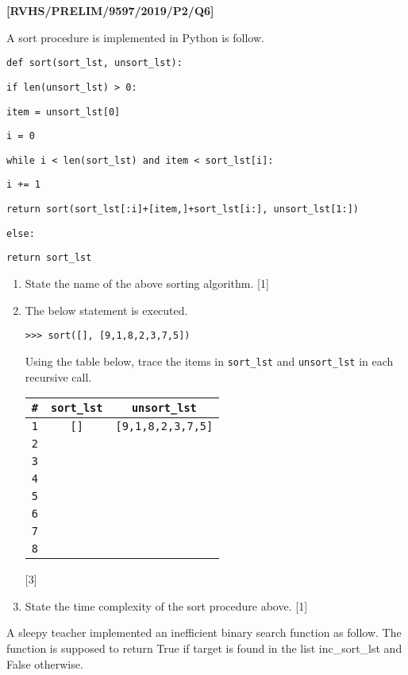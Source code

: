 \item \textbf{{[}RVHS/PRELIM/9597/2019/P2/Q6{]} }

A sort procedure is implemented in Python is follow.

\noindent %
\noindent\begin{minipage}[t]{1\columnwidth}%
\texttt{def sort(sort\_lst, unsort\_lst):}

\texttt{\qquad{}if len(unsort\_lst) > 0: }

\texttt{\qquad{}\qquad{}item = unsort\_lst{[}0{]} }

\texttt{\qquad{}\qquad{}i = 0 }

\texttt{\qquad{}\qquad{}while i < len(sort\_lst) and item < sort\_lst{[}i{]}: }

\texttt{\qquad{}\qquad{}\qquad{}i += 1 }

\texttt{\qquad{}\qquad{}return sort(sort\_lst{[}:i{]}+{[}item,{]}+sort\_lst{[}i:{]},
unsort\_lst{[}1:{]})}

\texttt{\qquad{}else:}

\texttt{\qquad{}\qquad{}return sort\_lst}%
\end{minipage}
\begin{enumerate}
\item State the name of the above sorting algorithm. \hfill{}{[}1{]}
\item The below statement is executed.

\texttt{>\textcompwordmark >\textcompwordmark > sort({[}{]}, {[}9,1,8,2,3,7,5{]})}

Using the table below, trace the items in \texttt{sort\_lst} and \texttt{unsort\_lst}
in each recursive call.
\noindent \begin{center}
\begin{tabular}{|c|c|c|}
\hline 
\texttt{\textbf{\#}} & \texttt{\textbf{sort\_lst}} & \texttt{\textbf{unsort\_lst}}\tabularnewline
\hline 
\texttt{1} & \texttt{{[}{]}} & \texttt{{[}9,1,8,2,3,7,5{]}}\tabularnewline
\hline 
\texttt{2} &  & \tabularnewline
\hline 
\texttt{3} &  & \tabularnewline
\hline 
\texttt{4} &  & \tabularnewline
\hline 
\texttt{5} &  & \tabularnewline
\hline 
\texttt{6} &  & \tabularnewline
\hline 
\texttt{7} &  & \tabularnewline
\hline 
\texttt{8} &  & \tabularnewline
\hline 
\end{tabular}
\par\end{center}

\hfill{}{[}3{]}
\item State the time complexity of the sort procedure above. \hfill{}{[}1{]}
\end{enumerate}
\quad{} A sleepy teacher implemented an inefficient binary search
function as follow. The function is supposed to return True if target
is found in the list inc\_sort\_lst and False otherwise.

